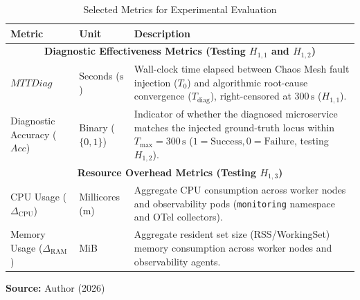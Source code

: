 \begin{table}[ht]
\centering
\caption{Selected Metrics for Experimental Evaluation}
\label{tab:metrics}
\begin{tabularx}{\textwidth}{|l|l|X|}
\hline
\textbf{Metric} & \textbf{Unit} & \textbf{Description} \\ \hline
\multicolumn{3}{|c|}{\textbf{Diagnostic Effectiveness Metrics (Testing $H_{1,1}$ and $H_{1,2}$)}} \\ \hline
$MTTDiag$ & Seconds ($\text{s}$) & Wall-clock time elapsed between Chaos Mesh fault injection ($T_0$) and algorithmic root-cause convergence ($T_{\text{diag}}$), right-censored at $300\,\text{s}$ ($H_{1,1}$). \\ \hline
Diagnostic Accuracy ($Acc$) & Binary ($\{0,1\}$) & Indicator of whether the diagnosed microservice matches the injected ground-truth locus within $T_{\text{max}} = 300\,\text{s}$ ($1 = \text{Success}, 0 = \text{Failure}$, testing $H_{1,2}$). \\ \hline
\multicolumn{3}{|c|}{\textbf{Resource Overhead Metrics (Testing $H_{1,3}$)}} \\ \hline
CPU Usage ($\Delta_{\text{CPU}}$) & Millicores ($\text{m}$) & Aggregate CPU consumption across worker nodes and observability pods (\texttt{monitoring} namespace and OTel collectors). \\ \hline
Memory Usage ($\Delta_{\text{RAM}}$) & MiB & Aggregate resident set size (RSS/WorkingSet) memory consumption across worker nodes and observability agents. \\ \hline
\end{tabularx}
\par\medskip
\small\textbf{Source:} Author (2026)
\end{table}
